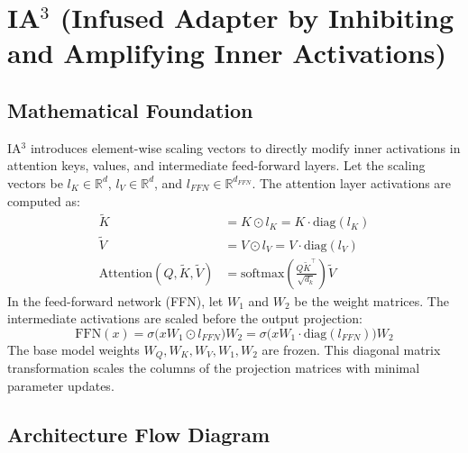 \newpage
\section{IA$^3$ (Infused Adapter by Inhibiting and Amplifying Inner Activations)}

\subsection{Mathematical Foundation}
IA$^3$ introduces element-wise scaling vectors to directly modify inner activations in attention keys, values, and intermediate feed-forward layers. Let the scaling vectors be $l_K \in \mathbb{R}^d$, $l_V \in \mathbb{R}^d$, and $l_{FFN} \in \mathbb{R}^{d_{FFN}}$.
The attention layer activations are computed as:
\begin{align}
  \tilde{K} &= K \odot l_K = K \cdot \text{diag}(l_K) \\
  \tilde{V} &= V \odot l_V = V \cdot \text{diag}(l_V) \\
  \text{Attention}(Q, \tilde{K}, \tilde{V}) &= \text{softmax}\left( \frac{Q \tilde{K}^\top}{\sqrt{d_k}} \right) \tilde{V}
\end{align}
In the feed-forward network (FFN), let $W_1$ and $W_2$ be the weight matrices. The intermediate activations are scaled before the output projection:
\begin{equation}
  \text{FFN}(x) = \sigma\bigl(x W_1 \odot l_{FFN}\bigr) W_2 = \sigma\bigl(x W_1 \cdot \text{diag}(l_{FFN})\bigr) W_2
\end{equation}
The base model weights $W_Q, W_K, W_V, W_1, W_2$ are frozen. This diagonal matrix transformation scales the columns of the projection matrices with minimal parameter updates.

\subsection{Architecture Flow Diagram}

